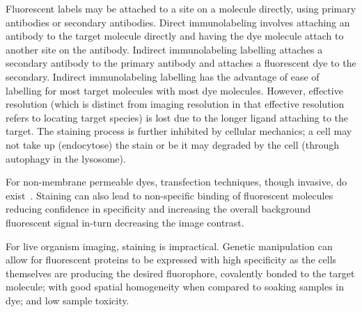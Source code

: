 Fluorescent labels may be attached to a site on a molecule directly, using primary antibodies or secondary antibodies.
Direct immunolabeling involves attaching an antibody to the target molecule directly and having the dye molecule attach to another site on the antibody.
Indirect immunolabeling labelling attaches a secondary antibody to the primary antibody and attaches a fluorescent dye to the secondary.
Indirect immunolabeling labelling has the advantage of ease of labelling for most target molecules with most dye molecules.
However, effective resolution (which is distinct from imaging resolution in that effective resolution refers to locating target species) is lost due to the longer ligand attaching to the target.%
The staining process is further inhibited by cellular mechanics; a cell may not take up (endocytose) the stain or be it may degraded by the cell (through \gls{autophagy} in the \gls{lysosome}).

For non-membrane permeable dyes, \gls{transfection} techniques, though invasive, do exist~\cite{kimMammalianCellTransfection2010}.
Staining can also lead to non-specific binding of fluorescent molecules reducing confidence in specificity and increasing the overall background fluorescent signal in-turn decreasing the image contrast.

For live organism imaging, staining is impractical.
Genetic manipulation can allow for fluorescent proteins to be expressed with high specificity as the cells themselves are producing the desired \gls{fluorophore}, covalently bonded to the target molecule; with good spatial homogeneity when compared to soaking samples in dye; and low sample toxicity.



%
%

